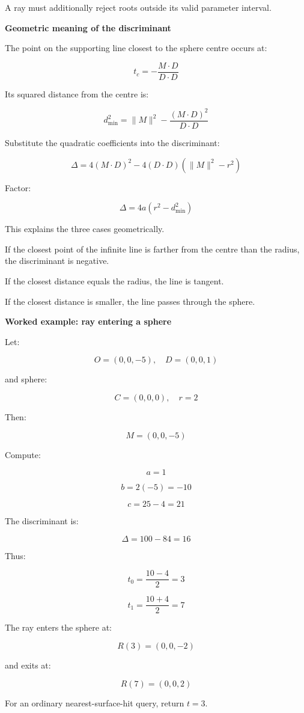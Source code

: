 A ray must additionally reject roots outside its valid parameter interval.

\textbf{Geometric meaning of the discriminant}

The point on the supporting line closest to the sphere centre occurs at:

\[
t_c=-\frac{M\cdot D}{D\cdot D}
\]

Its squared distance from the centre is:

\[
d_{\min}^2= \|M\|^2- \frac{(M\cdot D)^2}{D\cdot D}
\]

Substitute the quadratic coefficients into the discriminant:

\[
\Delta= 4(M\cdot D)^2 - 4(D\cdot D)(\|M\|^2-r^2)
\]

Factor:

\[
\boxed{ \Delta=4a(r^2-d_{\min}^2) }
\]

This explains the three cases geometrically.

If the closest point of the infinite line is farther from the centre than the radius, the discriminant is negative.

If the closest distance equals the radius, the line is tangent.

If the closest distance is smaller, the line passes through the sphere.

\textbf{Worked example: ray entering a sphere}

Let:

\[
O=(0,0,-5),\quad D=(0,0,1)
\]

and sphere:

\[
C=(0,0,0),\quad r=2
\]

Then:

\[
M=(0,0,-5)
\]

Compute:

\[
a=1
\]

\[
b=2(-5)=-10
\]

\[
c=25-4=21
\]

The discriminant is:

\[
\Delta=100-84=16
\]

Thus:

\[
t_0=\frac{10-4}{2}=3
\]

\[
t_1=\frac{10+4}{2}=7
\]

The ray enters the sphere at:

\[
R(3)=(0,0,-2)
\]

and exits at:

\[
R(7)=(0,0,2)
\]

For an ordinary nearest-surface-hit query, return \(t=3\).

